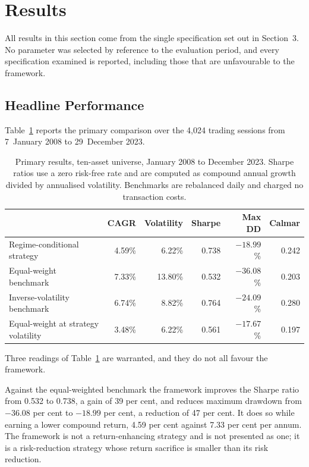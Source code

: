 \section{Results}
\label{sec:results}

All results in this section come from the single specification set out in Section~3.
No parameter was selected by reference to the evaluation period, and every
specification examined is reported, including those that are unfavourable to the
framework.

\subsection{Headline Performance}

Table~\ref{tab:main} reports the primary comparison over the 4{,}024 trading sessions from
7~January 2008 to 29~December 2023.

\begin{table}[!ht]
\centering
\caption{Primary results, ten-asset universe, January 2008 to December 2023. Sharpe
ratios use a zero risk-free rate and are computed as compound annual growth divided by
annualised volatility. Benchmarks are rebalanced daily and charged no transaction costs.}
\label{tab:main}
\small
\begin{tabular}{p{4.4cm}rrrrr}
\hline
& \textbf{CAGR} & \textbf{Volatility} & \textbf{Sharpe} & \textbf{Max DD} & \textbf{Calmar} \\
\hline
Regime-conditional strategy & 4.59\% & 6.22\% & 0.738 & $-18.99$\% & 0.242 \\
Equal-weight benchmark & 7.33\% & 13.80\% & 0.532 & $-36.08$\% & 0.203 \\
Inverse-volatility benchmark & 6.74\% & 8.82\% & 0.764 & $-24.09$\% & 0.280 \\
Equal-weight at strategy volatility & 3.48\% & 6.22\% & 0.561 & $-17.67$\% & 0.197 \\
\hline
\end{tabular}
\end{table}

Three readings of Table~\ref{tab:main} are warranted, and they do not all favour the framework.

Against the equal-weighted benchmark the framework improves the Sharpe ratio from 0.532
to 0.738, a gain of 39 per cent, and reduces maximum drawdown from $-36.08$ per cent to
$-18.99$ per cent, a reduction of 47 per cent. It does so while earning a lower
compound return, 4.59 per cent against 7.33 per cent per annum. The framework is not a
return-enhancing strategy and is not presented as one; it is a risk-reduction strategy
whose return sacrifice is smaller than its risk reduction.

